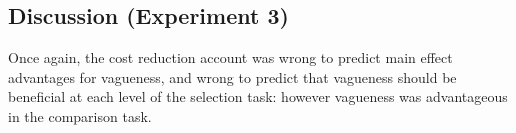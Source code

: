 \subsection{Discussion (Experiment 3)}
Once again, the cost reduction account was wrong to predict main effect advantages for vagueness, and wrong to predict that vagueness should be beneficial at each level of the selection task: however vagueness was advantageous in the comparison task.


